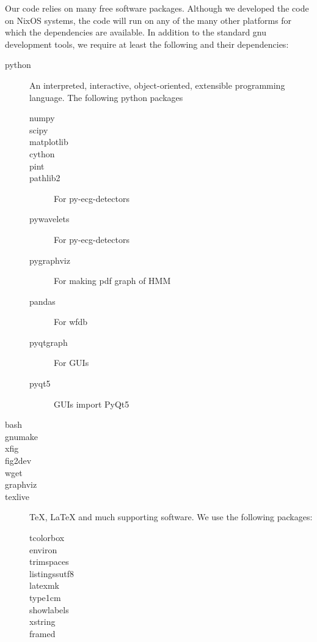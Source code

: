 Our code relies on many free software packages.  Although we developed
the code on NixOS systems, the code will run on any of the many other
platforms for which the dependencies are available.  In addition to
the standard gnu development tools, we require at least the following
and their dependencies:
  \begin{description}
  \item[python] An interpreted, interactive, object-oriented,
    extensible programming language.  The following python packages
    \begin{description}
    \item[numpy] 
    \item[scipy] 
    \item[matplotlib]
    \item[cython] 
    \item[pint] 
    \item[pathlib2] For py-ecg-detectors
    \item[pywavelets] For py-ecg-detectors
    \item[pygraphviz] For making pdf graph of HMM
    \item[pandas] For wfdb
    \item[pyqtgraph] For GUIs
    \item[pyqt5] GUIs import PyQt5
    \end{description}
  \item[bash] 
  \item[gnumake] 
  \item[xfig]
  \item[fig2dev] 
  \item[wget]
  \item[graphviz] 
  \item[texlive] TeX, LaTeX and much supporting software.  We use the
    following packages:
    \begin{description}
    \item[tcolorbox] 
    \item[environ] 
    \item[trimspaces] 
    \item[listingssutf8] 
    \item[latexmk]
    \item[type1cm] 
    \item[showlabels] 
    \item[xstring] 
    \item[framed] 
    \end{description}
  \end{description}

